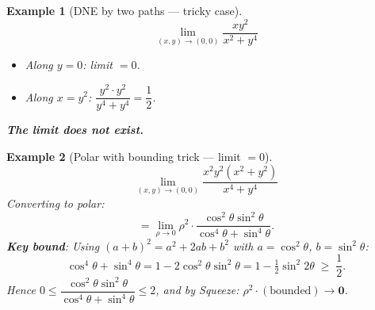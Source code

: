 \documentclass[12pt,a4paper]{article}
\newtheorem{example}{Example}
\begin{document}
\begin{example}[DNE by two paths --- tricky case]
\[
  \lim_{(x,y)\to(0,0)} \frac{xy^2}{x^2+y^4}
\]

\begin{center}
\end{center}

\begin{itemize}
  \item Along $y=0$: limit $= 0$.
  \item Along $x=y^2$: $\dfrac{y^2\cdot y^2}{y^4+y^4}=\dfrac{1}{2}$.
\end{itemize}
\textbf{The limit does not exist.}
\end{example}

\begin{example}[Polar with bounding trick --- limit $= 0$]
\[
  \lim_{(x,y)\to(0,0)} \frac{x^2 y^2(x^2+y^2)}{x^4+y^4}
\]
Converting to polar:
\[
  = \lim_{\rho\to 0}\rho^2\cdot
    \frac{\cos^2\theta\sin^2\theta}{\cos^4\theta+\sin^4\theta}.
\]
\textbf{Key bound}: Using $(a+b)^2 = a^2+2ab+b^2$ with $a=\cos^2\theta$, $b=\sin^2\theta$:
\[
  \cos^4\theta+\sin^4\theta = 1 - 2\cos^2\theta\sin^2\theta
  = 1-\tfrac{1}{2}\sin^2 2\theta \;\ge\; \frac{1}{2}.
\]
Hence $0\le\dfrac{\cos^2\theta\sin^2\theta}{\cos^4\theta+\sin^4\theta}\le 2$,
and by Squeeze: $\rho^2\cdot(\text{bounded})\to \mathbf{0}$.
\end{example}
\end{document}

